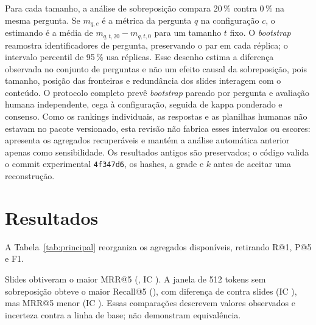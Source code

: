 \documentclass[conference]{IEEEtran}
\begin{document}
Para cada tamanho, a análise de sobreposição compara 20\,\% contra 0\,\% na mesma pergunta.
Se $m_{q,c}$ é a métrica da pergunta $q$ na configuração $c$, o estimando é a média de $m_{q,t,20}-m_{q,t,0}$ para um tamanho $t$ fixo.
O \textit{bootstrap} reamostra identificadores de pergunta, preservando o par em cada réplica; o intervalo percentil de 95\,\% usa \NBootstrap{} réplicas.
Esse desenho estima a diferença observada no conjunto de perguntas e não um efeito causal da sobreposição, pois tamanho, posição das fronteiras e redundância dos slides interagem com o conteúdo.
O protocolo completo prevê \textit{bootstrap} pareado por pergunta e avaliação humana independente, cega à configuração, seguida de kappa ponderado e consenso.
Como os rankings individuais, as \NPares{} respostas e as planilhas humanas não estavam no pacote versionado, esta revisão não fabrica esses intervalos ou escores: apresenta os agregados recuperáveis e mantém a análise automática anterior apenas como sensibilidade.
Os resultados antigos são preservados; o código valida o commit experimental \texttt{4f347d6}, os hashes, a grade e $k$ antes de aceitar uma reconstrução.

\section{Resultados}
A Tabela~\ref{tab:principal} reorganiza os agregados disponíveis, retirando R@1, P@5 e F1.

\begin{table}[!t]
\centering
\caption{Resultados disponíveis por configuração (tamanho/sobreposição). R@5 e MRR@5: \NRespondiveisTeste{} perguntas; Multi@5: subconjunto multitrecho; Cob. cit.: respostas respondíveis não abstidas; Rel. cit.: somente respostas com citação válida; Corr., Fid. e N. sust.: análise de sensibilidade por dois juízes automáticos, respectivamente em $[0,1]$, $[0,1]$ e escala truncada $0$--$3$; Tok. ent.: tokens de entrada do gerador.}
\label{tab:principal}
\scriptsize
\setlength{\tabcolsep}{2.8pt}

\end{table}

Slides obtiveram o maior MRR@5 (\MRRSlide{}, IC \MRRSlideIC).
A janela de 512 tokens sem sobreposição obteve o maior Recall@5 (\RecallCincoCGrdSem{}), com diferença de \DifRecallCincoCGrdSem{} contra slides (IC \DifRecallCincoCGrdSemIC), mas MRR@5 \DifMRRCGrdSem{} menor (IC \DifMRRCGrdSemIC).
Essas comparações descrevem valores observados e incerteza contra a linha de base; não demonstram equivalência.
\end{document}
